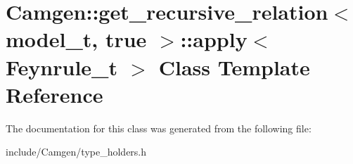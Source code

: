 \hypertarget{a00014}{\section{Camgen\-:\-:get\-\_\-recursive\-\_\-relation$<$ model\-\_\-t, true $>$\-:\-:apply$<$ Feynrule\-\_\-t $>$ Class Template Reference}
\label{a00014}
}


The documentation for this class was generated from the following file\-:\begin{DoxyCompactItemize}
\item 
include/\-Camgen/type\-\_\-holders.\-h\end{DoxyCompactItemize}
